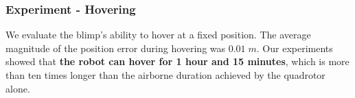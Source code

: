 \documentclass[conference]{ieeeconf}
\newcommand{\diego}[1]{{\color{brown}#1}}
\begin{document}
\subsubsection{Experiment - Hovering}
{
We evaluate the blimp's ability to hover at a fixed position. 
%
The average magnitude of the position error during hovering was $0.01\; m$. 
Our experiments showed that \textbf{the robot can hover for 1 hour and 15 minutes}, which is more than ten times longer than the airborne duration achieved by the quadrotor alone.
%
}





\end{document}
